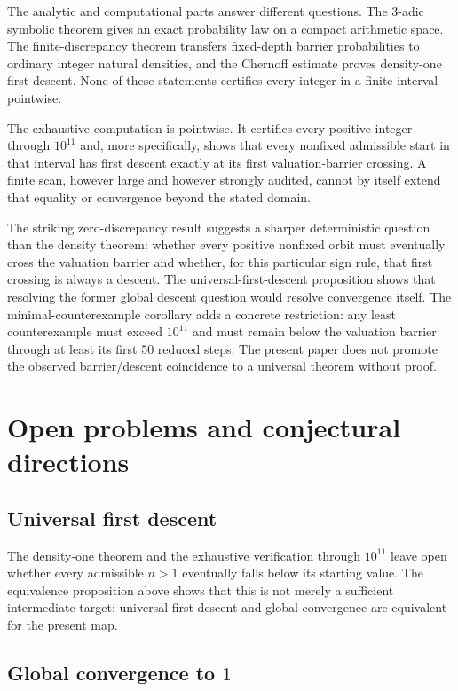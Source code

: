 \documentclass[11pt]{article}
\theoremstyle{definition}
\theoremstyle{remark}
\begin{document}
The analytic and computational parts answer different questions.  The $3$-adic symbolic theorem gives an exact probability law on a compact arithmetic space.  The finite-discrepancy theorem transfers fixed-depth barrier probabilities to ordinary integer natural densities, and the Chernoff estimate proves density-one first descent.  None of these statements certifies every integer in a finite interval pointwise.

The exhaustive computation is pointwise.  It certifies every positive integer through $10^{11}$ and, more specifically, shows that every nonfixed admissible start in that interval has first descent exactly at its first valuation-barrier crossing.  A finite scan, however large and however strongly audited, cannot by itself extend that equality or convergence beyond the stated domain.

The striking zero-discrepancy result suggests a sharper deterministic question than the density theorem: whether every positive nonfixed orbit must eventually cross the valuation barrier and whether, for this particular sign rule, that first crossing is always a descent.  The universal-first-descent proposition shows that resolving the former global descent question would resolve convergence itself.  The minimal-counterexample corollary adds a concrete restriction: any least counterexample must exceed $10^{11}$ and must remain below the valuation barrier through at least its first $50$ reduced steps.  The present paper does not promote the observed barrier/descent coincidence to a universal theorem without proof.

\section{Open problems and conjectural directions}

\subsection{Universal first descent}

The density-one theorem and the exhaustive verification through $10^{11}$ leave open whether every admissible $n>1$ eventually falls below its starting value.  The equivalence proposition above shows that this is not merely a sufficient intermediate target: universal first descent and global convergence are equivalent for the present map.

\subsection{Global convergence to $1$}
\end{document}
